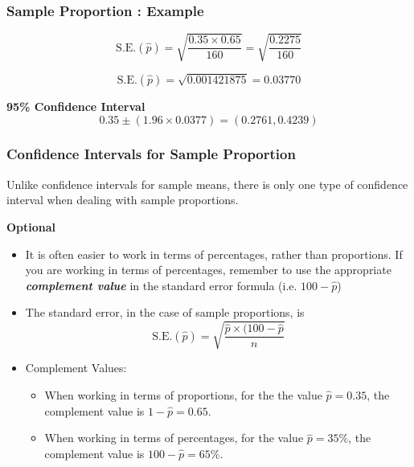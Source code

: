 \begin{frame}
\frametitle{ Sample Proportion : Example}
\[ \mbox{S.E.}(\hat{p}) =  \sqrt{\frac{0.35 \times 0.65}{160}} = \sqrt{\frac{0.2275}{160}}\]

\[ \mbox{S.E.}(\hat{p}) = \sqrt{0.001421875} = 0.03770\]

\textbf{95\% Confidence Interval}
\[0.35 \pm (1.96 \times 0.0377) = (0.2761, 0.4239)\]
\end{frame}
\begin{frame}
\frametitle{Confidence Intervals for Sample Proportion}
Unlike confidence intervals for sample means, there is only one type of confidence interval when dealing with sample proportions.

\textbf{Optional}
\begin{itemize}

\item It is often easier to work in terms of percentages, rather than proportions.
If you are working in terms of percentages, remember to use the appropriate \textbf{\textit{complement value}} in the standard error formula (i.e. $100 - \hat{p}$)

\item The standard error, in the case of sample proportions, is
\[ \mbox{S.E.}(\hat{p}) = \sqrt{\frac{\hat{p}\times (100-\hat{p}}{n}}\]

\item Complement Values:
\begin{itemize} \item When working in terms of proportions, for the the value $\hat{p} =0.35$, the complement value is $1-\hat{p} =0.65$.
\item When working in terms of percentages, for the value $\hat{p} = 35\%$, the complement value is $100-\hat{p} = 65\%$.
\end{itemize}
\end{itemize}
\end{frame}








